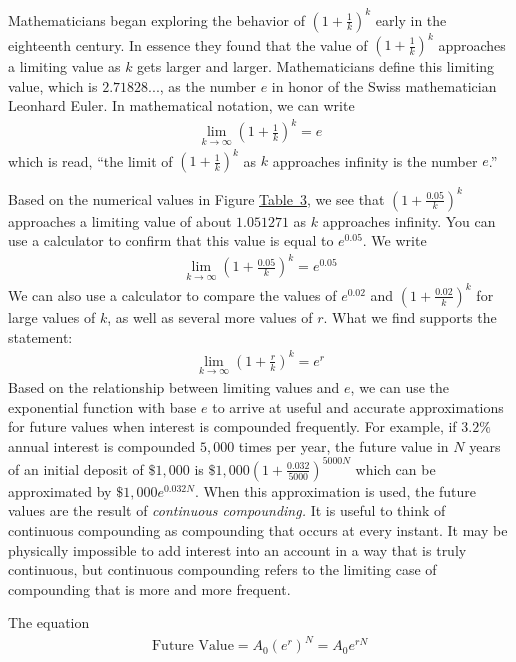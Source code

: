 \documentclass[10pt,]{book}
\theoremstyle{plain}
\theoremstyle{definition}
\theoremstyle{definition}
\theoremstyle{definition}
\numberwithin{equation}{section}
\begin{document}
Mathematicians began exploring the behavior of \((1+\frac{1}{k})^k\) early in the eighteenth century.  In essence they found that the value of \((1+\frac{1}{k})^k\) approaches a limiting value as \(k\) gets larger and larger.  Mathematicians define this limiting value, which is \(2.71828...\), as the number \(e\) in honor of the Swiss mathematician Leonhard Euler.  In mathematical notation, we can write%
%
\begin{gather*}
\lim_{k \to \infty} (1 + \frac{1}{k})^k = e 
\end{gather*}
which is read, “the limit of \((1 + \frac{1}{k})^k\) as \(k\) approaches infinity is the number \(e\).”%
\par
Based on the numerical values in Figure \hyperref[impact-of-k]{Table~3}, we see that \((1 + \frac{0.05}{k})^k\) approaches a limiting value of about \(1.051271\) as \(k\) approaches infinity. You can use a calculator to confirm that this value is equal to \(e^0.05\). We write%
%
\begin{gather*}
\lim_{k \to \infty} (1 + \frac{0.05}{k})^k = e^{0.05}
\end{gather*}
We can also use a calculator to compare the values of \(e^{0.02}\) and \((1 + \frac{0.02}{k})^k\) for large values of \(k\), as well as several more values of \(r\).  What we find supports the statement:%
%
\begin{gather*}
\lim_{k \to \infty} (1 + \frac{r}{k})^k = e^r
\end{gather*}
Based on the relationship between limiting values and \(e\), we can use the exponential function with base \(e\) to arrive at useful and accurate approximations for future values when interest is compounded frequently.  For example, if \(3.2\%\) annual interest is compounded \(5,000\) times per year, the future value in \(N\) years of an initial deposit of \(\$1,000\) is \(\$1,000(1+\frac{0.032}{5000})^{5000N}\) which can be approximated by \(\$1,000e^{0.032N}\).  When this approximation is used, the future values are the result of \emph{continuous compounding.}  It is useful to think of continuous compounding as compounding that occurs at every instant. It may be physically impossible to add interest into an account in a way that is truly continuous, but continuous compounding refers to the limiting case of compounding that is more and more frequent.%
\par
The equation%
%
\begin{gather*}
\text{Future Value} = A_0 (e^r)^N = A_0 e^{rN}
\end{gather*}
\end{document}

